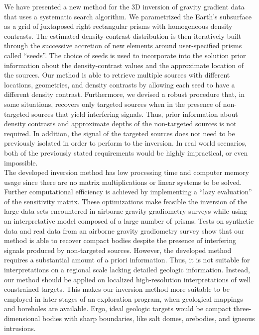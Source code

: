 We have presented a new method for the 3D inversion of gravity gradient data
that uses a systematic search algorithm.
We parametrized the Earth's subsurface as a grid of juxtaposed right rectangular
prisms with homogeneous density contrasts.
The estimated density-contrast distribution is then iteratively built through
the successive accretion of new elements around user-specified prisms called
``seeds''.
The choice of seeds is used to incorporate into the solution prior information
about the density-contrast values and the approximate location of the sources.
Our method is able to retrieve multiple sources with different locations,
geometries, and density contrasts by allowing each seed to have a different
density contrast.
Furthermore, we devised a robust procedure that, in some situations, recovers
only targeted sources when in the presence of non-targeted sources that yield
interfering signals.
Thus, prior information about density contrasts and approximate depths of
the non-targeted sources is not required.
In addition, the signal of the targeted sources does not need to
be previously isolated in order to perform to the inversion.
In real world scenarios, both of the previously stated requirements would be
highly impractical, or even impossible.
\\ \indent
The developed inversion method has low processing time and computer memory
usage since there are no matrix multiplications or linear systems to be solved.
Further computational efficiency is achieved by implementing a
``lazy evaluation'' of the sensitivity matrix.
These optimizations make feasible the inversion of the large data sets
encountered in airborne gravity gradiometry surveys while using an
interpretative model composed of a large number of prisms.
Tests on synthetic data and real data from an airborne gravity gradiometry
survey show that our method is able to recover compact bodies despite the
presence of interfering signals produced by non-targeted sources.
However, the developed method requires a substantial amount of a priori
information.
Thus, it is not suitable for interpretations on a regional scale lacking
detailed geologic information.
Instead, our method should be applied on localized high-resolution
interpretations of well constrained targets.
This makes our inversion method more suitable to be employed in later stages of
an exploration program, when geological mappings and boreholes are available.
Ergo, ideal geologic targets would be compact three-dimensional bodies
with sharp boundaries, like salt domes, orebodies, and igneous intrusions.


